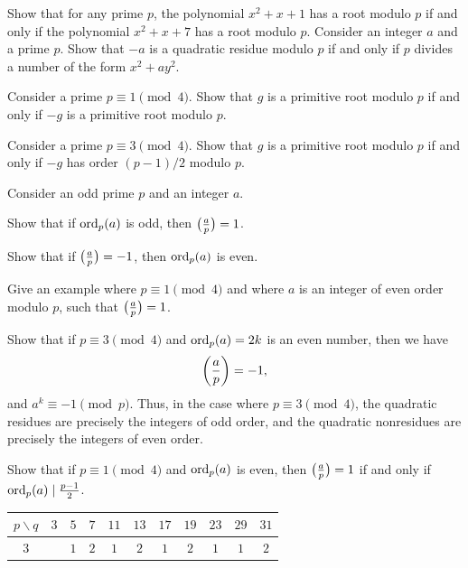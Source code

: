 \begin{routine}
  \exercise Show that for any prime $p$, the polynomial $x^2+x+1$ has a root modulo $p$ if and only if the polynomial $x^2+x+7$ has a root modulo $p$.
  \exercise Consider an integer $a$ and a prime $p$. Show that $-a$ is a quadratic residue modulo $p$ if and only if $p$ divides a number of the form $x^2+ay^2$.
  \exercise
  \begin{subexenum}
  \item Consider a prime $p\equiv 1\pmod{4}$. Show that $g$ is a primitive root modulo $p$ if and only if $-g$ is a primitive root modulo $p$.
  \item Consider a prime $p\equiv 3\pmod{4}$. Show that $g$ is a primitive root modulo $p$ if and only if $-g$ has order $(p-1)/2$ modulo $p$.
  \end{subexenum}
  \exercise \label{exercise:uniform-legendre-exponent}Consider an odd prime $p$ and an integer $a$.
  \begin{subexenum}
  \item Show that if $\operatorname{ord}_p(a)$ is odd, then $\legendre{a}{p}=1$.
  \item Show that if $\legendre{a}{p}=-1$, then $\operatorname{ord}_p(a)$ is even.
  \item Give an example where $p\equiv 1\pmod{4}$ and where $a$ is an integer of even order modulo $p$, such that $\legendre{a}{p}=1$.
  \item Show that if $p\equiv 3\pmod{4}$ and $\operatorname{ord}_p(a)=2k$ is an even number, then we have
    \begin{equation*}
      \legendre{a}{p}=-1,
    \end{equation*}
    and $a^k\equiv -1\pmod{p}$. Thus, in the case where $p\equiv 3\pmod{4}$, the quadratic residues are precisely the integers of odd order, and the quadratic nonresidues are precisely the integers of even order.
  \item Show that if $p\equiv 1\pmod{4}$ and $\operatorname{ord}_p(a)$ is even, then $\legendre{a}{p}=1$ if and only if $\operatorname{ord}_p(a)\mid\frac{p-1}{2}$.
  \item %
    \begin{table}
    \centering
    \begin{tabular}{c|cccccccccc}
      \toprule
      $p \backslash q$ & $3$ & $5$ & $7$ & $11$ & $13$ & $17$ & $19$ & $23$ & $29$ & $31$ \\ \midrule
      $3$ & \text{-} & $1$ & $2$ & $1$ & $2$ & $1$ & $2$ & $1$ & $1$ & $2$ \\

\end{tabular}
\end{table}
\end{subexenum}
\end{routine}
